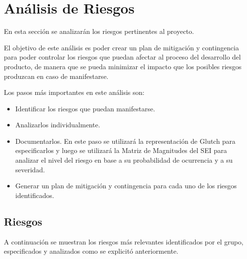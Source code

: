 \section{An\'alisis de Riesgos}

En esta secci\'on se analizar\'an los riesgos pertinentes al proyecto.

El objetivo de este an\'alisis es poder crear un plan de mitigaci\'on y contingencia para poder controlar los riesgos que puedan afectar al proceso del desarrollo del producto, de manera que se pueda minimizar el impacto que los posibles riesgos produzcan en caso de manifestarse.

Los pasos m\'as importantes en este an\'alisis son:

\begin{itemize}
\item Identificar los riesgos que puedan manifestarse.
\item Analizarlos individualmente.
\item Documentarlos. En este paso se utilizar\'a la representaci\'on de Glutch para especificarlos y luego se utilizar\'a la Matriz de Magnitudes del SEI para analizar el nivel del riesgo en base a su probabilidad de ocurrencia y a su severidad.
\item Generar un plan de mitigaci\'on y contingencia para cada uno de los riesgos identificados.
\end{itemize}


\subsection{Riesgos}


A continuaci\'on se muestran los riesgos m\'as relevantes identificados por el grupo, especificados y analizados como se explicit\'o anteriormente.

